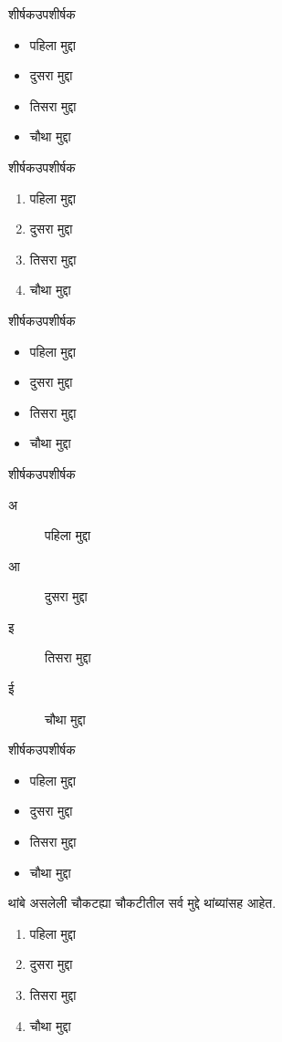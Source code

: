 \maketitle
\begin{frame}{शीर्षक}{उपशीर्षक}
  \begin{itemize}
  \item पहिला मुद्दा
  \item दुसरा मुद्दा
  \item तिसरा मुद्दा
  \item चौथा मुद्दा
  \end{itemize}
\end{frame}
\begin{frame}{शीर्षक}{उपशीर्षक}
  \begin{enumerate}
  \item पहिला मुद्दा
  \item दुसरा मुद्दा
  \item तिसरा मुद्दा
  \item चौथा मुद्दा
  \end{enumerate}
\end{frame}
\begin{frame}{शीर्षक}{उपशीर्षक}
  \begin{itemize}
  \item पहिला मुद्दा
  \item दुसरा मुद्दा
  \item तिसरा मुद्दा
  \item चौथा मुद्दा
  \end{itemize}
\end{frame}
\begin{frame}{शीर्षक}{उपशीर्षक}
  \begin{description}
  \item[अ] पहिला मुद्दा
  \item[आ] दुसरा मुद्दा
  \item[इ] तिसरा मुद्दा
  \item[ई] चौथा मुद्दा
  \end{description}
\end{frame}
\begin{frame}{शीर्षक}{उपशीर्षक}
  \begin{itemize}
  \item पहिला मुद्दा
  \item दुसरा मुद्दा
  \item तिसरा मुद्दा
  \item चौथा मुद्दा
  \end{itemize}
\end{frame}
\begin{frame}{थांबे असलेली चौकट}{ह्या चौकटीतील सर्व मुद्दे थांब्यांसह आहेत.}
  \begin{enumerate}
  \item<+-> पहिला मुद्दा
  \item<+-> दुसरा मुद्दा
  \item<+-> तिसरा मुद्दा
  \item<+-> चौथा मुद्दा
  \end{enumerate}
\end{frame}
